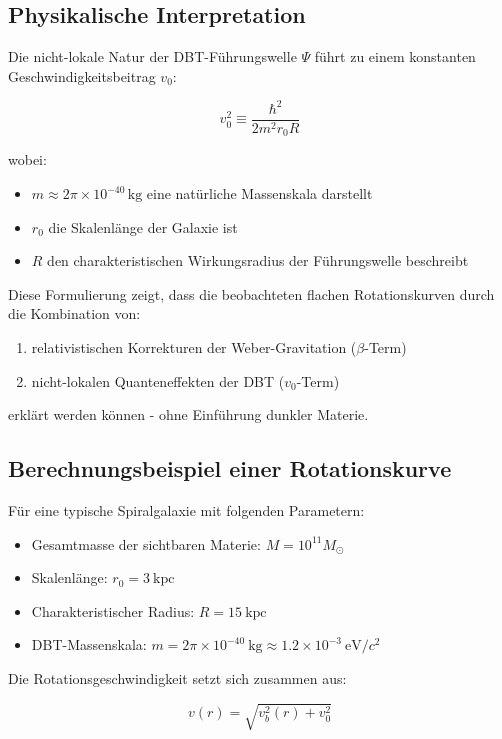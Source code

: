 \subsection{Physikalische Interpretation}
Die nicht-lokale Natur der DBT-Führungswelle $\Psi$ führt zu einem konstanten Geschwindigkeitsbeitrag $v_0$:

\begin{equation}
v_0^2 \equiv \frac{\hbar^2}{2m^2 r_0 R}
\end{equation}

wobei:
\begin{itemize}
\item $m \approx 2\pi \times 10^{-40}\,\text{kg}$ eine natürliche Massenskala darstellt
\item $r_0$ die Skalenlänge der Galaxie ist
\item $R$ den charakteristischen Wirkungsradius der Führungswelle beschreibt
\end{itemize}

Diese Formulierung zeigt, dass die beobachteten flachen Rotationskurven durch die Kombination von:
\begin{enumerate}
\item relativistischen Korrekturen der Weber-Gravitation ($\beta$-Term)
\item nicht-lokalen Quanteneffekten der DBT ($v_0$-Term)
\end{enumerate}
erklärt werden können - ohne Einführung dunkler Materie.

\subsection{Berechnungsbeispiel einer Rotationskurve}

Für eine typische Spiralgalaxie mit folgenden Parametern:
\begin{itemize}
\item Gesamtmasse der sichtbaren Materie: $M = 10^{11} M_\odot$
\item Skalenlänge: $r_0 = 3\ \text{kpc}$
\item Charakteristischer Radius: $R = 15\ \text{kpc}$
\item DBT-Massenskala: $m = 2\pi \times 10^{-40}\ \text{kg} \approx 1.2 \times 10^{-3}\ \text{eV}/c^2$
\end{itemize}

Die Rotationsgeschwindigkeit setzt sich zusammen aus:

\begin{equation}
v(r) = \sqrt{v_b^2(r) + v_0^2}
\end{equation}


